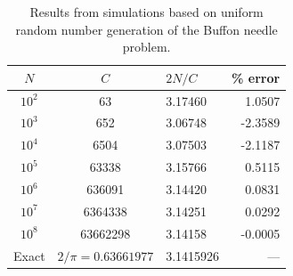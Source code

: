 \begin{table}[t!]
\centering\leavevmode
\begin{tabular}{|c|c|l|r|}
\hline
$N$ & $C$ &  $2N/C$ & \% error\\
\hline\hline
$10^{2}$ & 63&3.17460& 1.0507\\
$10^{3}$ & 652 &3.06748& -2.3589\\
$10^{4}$ & 6504 & 3.07503& -2.1187\\
$10^{5}$ & 63338 &3.15766& 0.5115\\
$10^{6}$ & 636091 & 3.14420& 0.0831\\
$10^{7}$ & 6364338 &3.14251& 0.0292\\
$10^{8}$ & 63662298 & 3.14158&-0.0005\\
\hline
Exact & $2/\pi=0.63661977$&3.1415926&---\\
\hline
\end{tabular}
\caption{\label{tb:buffon}Results from simulations based on uniform random number generation of the Buffon needle problem.}
\end{table}

%




